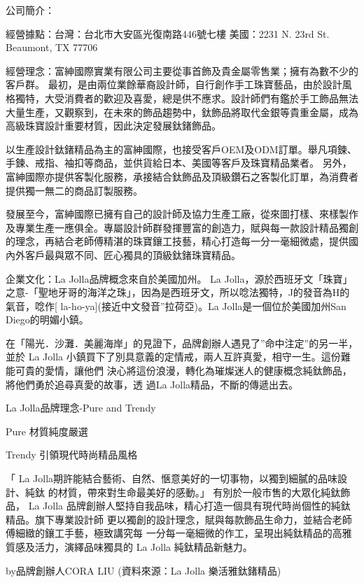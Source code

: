 公司簡介：

經營據點：台灣：台北市大安區光復南路446號七樓 
               美國：2231 N. 23rd St. Beaumont, TX 77706

 經營理念：富紳國際實業有限公司主要從事首飾及貴金屬零售業；擁有為數不少的客戶群。
最初，是由兩位業餘華裔設計師，自行創作手工珠寶藝品，由於設計風格獨特，大受消費者的歡迎及喜愛，總是供不應求。設計師們有鑑於手工飾品無法大量生產，又觀察到，在未來的飾品趨勢中，鈦飾品將取代金銀等貴重金屬，成為高級珠寶設計重要材質，因此決定發展鈦鍺飾品。

以生產設計鈦鍺精品為主的富紳國際，也接受客戶OEM及ODM訂單。舉凡項鍊、手鍊、戒指、袖扣等商品，並供貨給日本、美國等客戶及珠寶精品業者。
另外，富紳國際亦提供客製化服務，承接結合鈦飾品及頂級鑽石之客製化訂單，為消費者
提供獨一無二的商品訂製服務。

發展至今，富紳國際已擁有自己的設計師及協力生產工廠，從來圖打樣、來樣製作及專業生產一應俱全。專屬設計師群發揮豐富的創造力，賦與每一款設計精品獨創的理念，再結合老師傅精湛的珠寶鑲工技藝，精心打造每一分一毫細微處，提供國內外客戶最與眾不同、匠心獨具的頂級鈦鍺珠寶精品。

 企業文化：La Jolla品牌概念來自於美國加州。 La Jolla，源於西班牙文「珠寶」之意-「聖地牙哥的海洋之珠」，因為是西班牙文，所以唸法獨特，J的發音為H的氣音，唸作[ la-ho-ya](接近中文發音”拉荷亞)。La Jolla是一個位於美國加州San Diego的明媚小鎮。

在「陽光．沙灘．美麗海岸」的見證下，品牌創辦人遇見了”命中注定”的另一半，並於 La Jolla
小鎮買下了別具意義的定情戒，兩人互許真愛，相守一生。這份難能可貴的愛情，讓他們
決心將這份浪漫，轉化為璀燦迷人的健康概念純鈦飾品，將他們勇於追尋真愛的故事，透
過La Jolla精品，不斷的傳遞出去。

La Jolla品牌理念-Pure and  Trendy

Pure 材質純度嚴選 

Trendy 引領現代時尚精品風格 

「 La Jolla期許能結合藝術、自然、愜意美好的一切事物，以獨到細膩的品味設計、純鈦
的材質，帶來對生命最美好的感動。」 有別於一般市售的大眾化純鈦飾品， La Jolla
品牌創辦人堅持自我品味，精心打造一個具有現代時尚個性的純鈦精品。旗下專業設計師
更以獨創的設計理念，賦與每款飾品生命力，並結合老師傅細緻的鑲工手藝，極致講究每
一分每一毫細微的作工，呈現出純鈦精品的高雅質感及活力，演繹品味獨具的 La Jolla
純鈦精品新魅力。
                                                                                      
                             by品牌創辦人CORA LIU
(資料來源：La Jolla 樂活雅鈦鍺精品)
 

